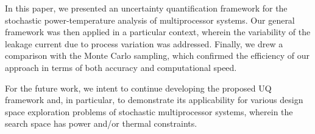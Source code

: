 In this paper, we presented an uncertainty quantification framework for the stochastic power-temperature analysis of multiprocessor systems. Our general framework was then applied in a particular context, wherein the variability of the leakage current due to process variation was addressed. Finally, we drew a comparison with the Monte Carlo sampling, which confirmed the efficiency of our approach in terms of both accuracy and computational speed.

For the future work, we intent to continue developing the proposed UQ framework and, in particular, to demonstrate its applicability for various design space exploration problems of stochastic multiprocessor systems, wherein the search space has power and/or thermal constraints.
